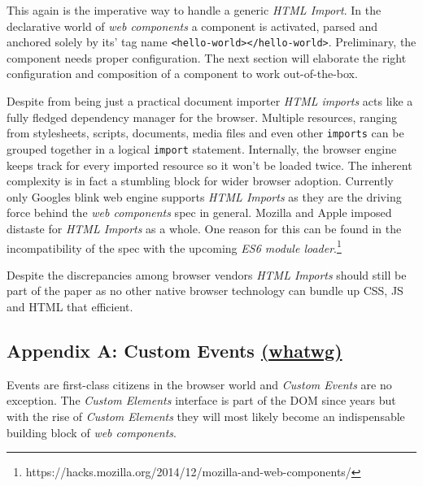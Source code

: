 \documentclass[]{article}
\begin{document}
This again is the imperative way to handle a generic \emph{HTML Import}.
In the declarative world of \emph{web components} a component is
activated, parsed and anchored solely by its' tag name
\texttt{\textless{}hello-world\textgreater{}\textless{}/hello-world\textgreater{}}.
Preliminary, the component needs proper configuration. The next section
will elaborate the right configuration and composition of a component to
work out-of-the-box.

Despite from being just a practical document importer \emph{HTML
imports} acts like a fully fledged dependency manager for the browser.
Multiple resources, ranging from stylesheets, scripts, documents, media
files and even other \texttt{imports} can be grouped together in a
logical \texttt{import} statement. Internally, the browser engine keeps
track for every imported resource so it won't be loaded twice. The
inherent complexity is in fact a stumbling block for wider browser
adoption. Currently only Googles blink web engine supports \emph{HTML
Imports} as they are the driving force behind the \emph{web components}
spec in general. Mozilla and Apple imposed distaste for \emph{HTML
Imports} as a whole. One reason for this can be found in the
incompatibility of the spec with the upcoming \emph{ES6 module
loader}.\footnote{https://hacks.mozilla.org/2014/12/mozilla-and-web-components/}

Despite the discrepancies among browser vendors \emph{HTML Imports}
should still be part of the paper as no other native browser technology
can bundle up CSS, JS and HTML that efficient.

\subsection{\texorpdfstring{Appendix A: Custom Events
\href{https://dom.spec.whatwg.org/\#interface-customevent}{(whatwg)}}{Appendix A: Custom Events (whatwg)}}\label{appendix-a-custom-events-whatwg}

Events are first-class citizens in the browser world and \emph{Custom
Events} are no exception. The \emph{Custom Elements} interface is part
of the DOM since years but with the rise of \emph{Custom Elements} they
will most likely become an indispensable building block of \emph{web
components}.
\end{document}
